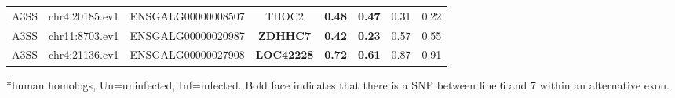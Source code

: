 \documentclass[10pt]{article}
\begin{document}
\begin{table}[!ht]
\begin{tabular}{cccccccc}
A3SS & chr4:20185.ev1 & ENSGALG00000008507 & THOC2 & \textbf{0.48} & \textbf{0.47} & 0.31 & 0.22 \\
A3SS & chr11:8703.ev1 & ENSGALG00000020987 & \textbf{ZDHHC7} & \textbf{0.42} & \textbf{0.23} & 0.57 & 0.55 \\
A3SS & chr4:21136.ev1 & ENSGALG00000027908 & \textbf{LOC42228} & \textbf{0.72} & \textbf{0.61} & 0.87 & 0.91 \\
\hline
\end{tabular}
\begin{flushleft}
    *human homologs, Un=uninfected, Inf=infected.
    Bold face indicates that there is a SNP between line 6 and 7 within an alternative exon.
\end{flushleft}
\label{tab:line67i_diff_line67u_two}
\end{table}
\end{document}

